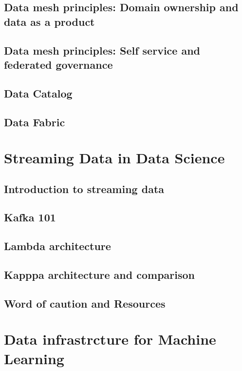 \documentclass[11pt]{article}
\begin{document}
    \subsection{Data mesh principles: Domain ownership and data as a product}

    \subsection{Data mesh principles: Self service and federated governance}

    \subsection{Data Catalog}

    \subsection{Data Fabric}

    \section{Streaming Data in Data Science}

    \subsection{Introduction to streaming data}
    
    \subsection{Kafka 101} %
    
    \subsection{Lambda architecture}
    
    \subsection{Kapppa architecture and comparison}
    
    \subsection{Word of caution and Resources}

    \section{Data infrastrcture for Machine Learning}
\end{document}
